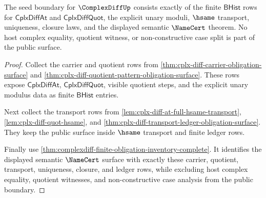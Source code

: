 \begin{theorem}
\label{thm:complex-differentiability-seed-boundary}
The seed boundary for $\ComplexDiffUp$ consists exactly of the finite
$\mathsf{BHist}$ rows for $\mathsf{CplxDiffAt}$ and
$\mathsf{CplxDiffQuot}$, the explicit unary moduli, $\hsame$ transport,
uniqueness, closure laws, and the displayed semantic $\NameCert$ theorem. No
host complex equality, quotient witness, or non-constructive case split is part
of the public surface.
\end{theorem}
\begin{proof}
Collect the carrier and quotient rows from
\autoref{thm:cplx-diff-carrier-obligation-surface} and
\autoref{thm:cplx-diff-quotient-pattern-obligation-surface}. These rows expose
$\mathsf{CplxDiffAt}$, $\mathsf{CplxDiffQuot}$, visible quotient steps, and the
explicit unary modulus data as finite $\mathsf{BHist}$ entries.

Next collect the transport rows from
\autoref{lem:cplx-diff-at-full-hsame-transport},
\autoref{lem:cplx-diff-quot-hsame}, and
\autoref{thm:cplx-diff-transport-ledger-obligation-surface}. They keep the
public surface inside $\hsame$ transport and finite ledger rows.

Finally use \autoref{thm:complexdiff-finite-obligation-inventory-complete}. It
identifies the displayed semantic $\NameCert$ surface with exactly these
carrier, quotient, transport, uniqueness, closure, and ledger rows, while
excluding host complex equality, quotient witnesses, and non-constructive case
analysis from the public boundary.
\end{proof}
